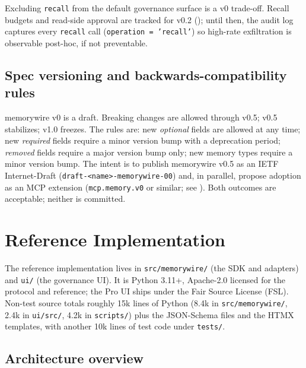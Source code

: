 \documentclass[11pt,letterpaper,twocolumn]{article}
\begin{document}
Excluding \texttt{recall} from the default governance surface is a v0 trade-off. Recall budgets and read-side approval are tracked for v0.2 (); until then, the audit log captures every \texttt{recall} call (\texttt{operation = 'recall'}) so high-rate exfiltration is observable post-hoc, if not preventable.

\subsection{Spec versioning and backwards-compatibility rules}
\label{sec:spec-versioning}

memorywire v0 is a draft. Breaking changes are allowed through v0.5; v0.5 stabilizes; v1.0 freezes. The rules are: new \emph{optional} fields are allowed at any time; new \emph{required} fields require a minor version bump with a deprecation period; \emph{removed} fields require a major version bump only; new memory types require a minor version bump. The intent is to publish memorywire v0.5 as an IETF Internet-Draft (\texttt{draft-<name>-memorywire-00}) and, in parallel, propose adoption as an MCP extension (\texttt{mcp.memory.v0} or similar; see ). Both outcomes are acceptable; neither is committed.

\section{Reference Implementation}
\label{sec:impl}

The reference implementation lives in \texttt{src/memorywire/} (the SDK and adapters) and \texttt{ui/} (the governance UI). It is Python 3.11+, Apache-2.0 licensed for the protocol and reference; the Pro UI ships under the Fair Source License (FSL). Non-test source totals roughly 15k lines of Python (8.4k in \texttt{src/memorywire/}, 2.4k in \texttt{ui/src/}, 4.2k in \texttt{scripts/}) plus the JSON-Schema files and the HTMX templates, with another 10k lines of test code under \texttt{tests/}.

\subsection{Architecture overview}
\label{sec:impl-arch}
\end{document}
